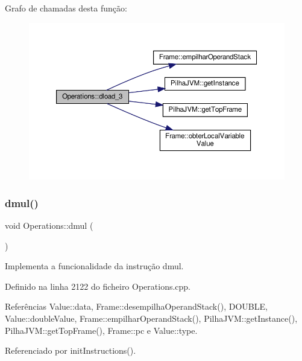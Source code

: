 Grafo de chamadas desta função\+:\nopagebreak
\begin{figure}[H]
\begin{center}
\leavevmode
\includegraphics[width=350pt]{classOperations_ab3a0a107f5c4a791c71b727142a69523_cgraph}
\end{center}
\end{figure}
\mbox{\label{classOperations_afe1944066f35f66d588d1a28124ebb55}} 
\subsubsection{\texorpdfstring{dmul()}{dmul()}}
{\footnotesize\ttfamily void Operations\+::dmul (\begin{DoxyParamCaption}{ }\end{DoxyParamCaption})\hspace{0.3cm}{\ttfamily [private]}}



Implementa a funcionalidade da instrução dmul. 



Definido na linha 2122 do ficheiro Operations.\+cpp.



Referências Value\+::data, Frame\+::desempilha\+Operand\+Stack(), D\+O\+U\+B\+LE, Value\+::double\+Value, Frame\+::empilhar\+Operand\+Stack(), Pilha\+J\+V\+M\+::get\+Instance(), Pilha\+J\+V\+M\+::get\+Top\+Frame(), Frame\+::pc e Value\+::type.



Referenciado por init\+Instructions().

